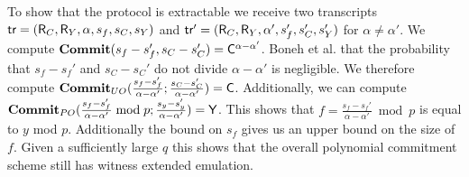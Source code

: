  To show that the protocol is extractable we receive two transcripts $\textsf{{tr}}=(\mathsf{R}_C,\mathsf{R}_Y,\alpha,s_f,s_C,s_Y)$ and $\textsf{{tr}}'=(\mathsf{R}_C,\mathsf{R}_Y,\alpha',s_f',s_C',s_Y')$ for $\alpha \neq \alpha'$. We compute $\textbf{{Commit}}(s_f-s_f',s_C-s_C')=\mathsf{C}^{\alpha-\alpha'}$. Boneh et al. \cite{C:BonBunFis19} that the probability that $s_f-s_f'$ and $s_C-s_C'$  do not divide $\alpha-\alpha'$ is negligible. We therefore compute $\textbf{{Commit}}_{UO}(\frac{ s_f-s_f'}{\alpha-\alpha'}; \frac{ s_C-s_C'}{\alpha-\alpha'})=\mathsf{C}$. Additionally, we can compute $\textbf{{Commit}}_{PO}( \frac{ s_f-s_f'}{\alpha-\alpha'} \bmod p; \frac{ s_y-s_y'}{\alpha-\alpha'})=\mathsf{Y}$. This shows that $f=\frac{ s_f-s_f'}{\alpha-\alpha'} \bmod p$ is equal to $y$ mod $p$. Additionally the bound on $s_f$ gives us an upper bound on the size of $f$. Given a sufficiently large $q$ this shows that the overall polynomial commitment scheme still has witness extended emulation.